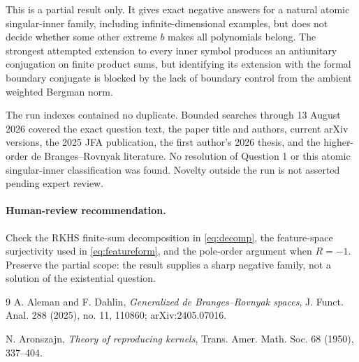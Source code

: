 \documentclass[11pt]{article}
\begin{document}
This is a partial result only.  It gives exact negative answers for a natural
atomic singular-inner family, including infinite-dimensional examples, but
does not decide whether some other extreme $b$ makes all polynomials belong.
The strongest attempted extension to every inner symbol produces an
antiunitary conjugation on finite product sums, but identifying its extension
with the formal boundary conjugate is blocked by the lack of boundary control
from the ambient weighted Bergman norm.

The run indexes contained no duplicate.  Bounded searches through 13 August
2026 covered the exact question text, the paper title and authors, current
arXiv versions, the 2025 JFA publication, the first author's 2026 thesis, and
the higher-order de Branges--Rovnyak literature.  No resolution of Question 1
or this atomic singular-inner classification was found.  Novelty outside the
run is not asserted pending expert review.

\paragraph{Human-review recommendation.}
Check the RKHS finite-sum decomposition in \eqref{eq:decomp}, the feature-space
surjectivity used in \eqref{eq:featureform}, and the pole-order argument when
$R=-1$.  Preserve the partial scope: the result supplies a sharp negative
family, not a solution of the existential question.

\begin{thebibliography}{9}
A. Aleman and F. Dahlin,
\emph{Generalized de Branges--Rovnyak spaces},
J. Funct. Anal. 288 (2025), no. 11, 110860;
arXiv:2405.07016.

N. Aronszajn,
\emph{Theory of reproducing kernels},
Trans. Amer. Math. Soc. 68 (1950), 337--404.
\end{thebibliography}
\end{document}
